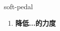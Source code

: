 
\begin{frame}
{\huge soft-pedal}
\begin{center}
\begin{enumerate}\Large
  \item \textbf{降低...的力度}
\end{enumerate}
\end{center}
\end{frame}
